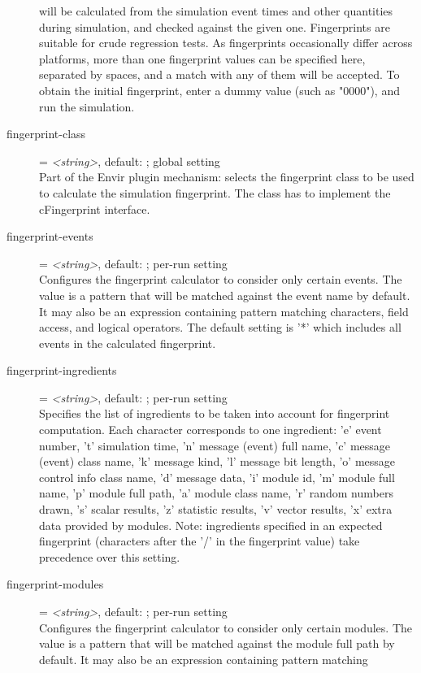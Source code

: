 \begin{description}
    will be calculated from the simulation event times and other quantities
    during simulation, and checked against the given one. Fingerprints are
    suitable for crude regression tests. As fingerprints occasionally differ
    across platforms, more than one fingerprint values can be specified here,
    separated by spaces, and a match with any of them will be accepted. To
    obtain the initial fingerprint, enter a dummy value (such as "0000"), and
    run the simulation.
\item[fingerprint-class] = \textit{<string>}, default: ; global setting \\
    Part of the Envir plugin mechanism: selects the fingerprint class to be
    used to calculate the simulation fingerprint. The class has to implement
    the cFingerprint interface.
\item[fingerprint-events] = \textit{<string>}, default: \ttt{*}; per-run setting \\
    Configures the fingerprint calculator to consider only certain events. The
    value is a pattern that will be matched against the event name by default.
    It may also be an expression containing pattern matching characters, field
    access, and logical operators. The default setting is '*' which includes
    all events in the calculated fingerprint.
\item[fingerprint-ingredients] = \textit{<string>}, default: ; per-run setting \\
    Specifies the list of ingredients to be taken into account for fingerprint
    computation. Each character corresponds to one ingredient: 'e' event
    number, 't' simulation time, 'n' message (event) full name, 'c' message
    (event) class name, 'k' message kind, 'l' message bit length, 'o' message
    control info class name, 'd' message data, 'i' module id, 'm' module full
    name, 'p' module full path, 'a' module class name, 'r' random numbers
    drawn, 's' scalar results, 'z' statistic results, 'v' vector results, 'x'
    extra data provided by modules. Note: ingredients specified in an expected
    fingerprint (characters after the '/' in the fingerprint value) take
    precedence over this setting.
\item[fingerprint-modules] = \textit{<string>}, default: \ttt{*}; per-run setting \\
    Configures the fingerprint calculator to consider only certain modules. The
    value is a pattern that will be matched against the module full path by
    default. It may also be an expression containing pattern matching

\end{description}
